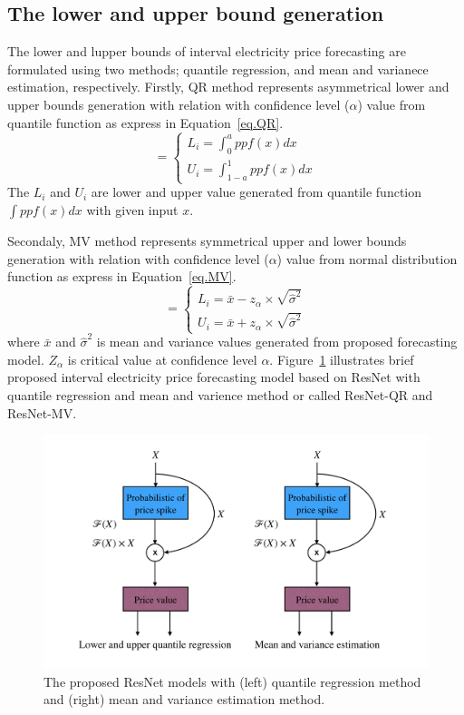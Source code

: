 \documentclass[review]{elsarticle}
\begin{document}
    \subsection{The lower and upper bound generation}
      The lower and lupper bounds of interval electricity price forecasting are formulated using two methods; quantile regression, and mean and varianece estimation, respectively.
      Firstly, QR method represents asymmetrical lower and upper bounds generation with relation with confidence level ($\alpha$) value from quantile function as express in Equation~\ref{eq.QR}.
      \begin{equation}
        [L_{i}, U_{i}]=
        \begin{cases}
        L_{i}=\int_{0}^{a} ppf(x) dx\\
        U_{i}=\int_{1-a}^{1} ppf(x) dx
        \end{cases}
        \label{eq.QR}
      \end{equation}
      The $L_{i}$ and $U_{i}$ are lower and upper value generated from quantile function $\int ppf(x) dx$ with given input $x$.

      Secondaly, MV method represents symmetrical upper and lower bounds generation with relation with confidence level ($\alpha$) value from normal distribution function as express in Equation~\ref{eq.MV}.
      \begin{equation}
        [L_{i}, U_{i}]=
        \begin{cases}
          L_{i}=\bar{x} - z_{\alpha} \times \sqrt{\hat{\sigma}^2}\\
          U_{i}=\bar{x} + z_{\alpha} \times \sqrt{\hat{\sigma}^2}
        \end{cases}
        \label{eq.MV}
      \end{equation}
      where $\bar{x}$ and $\hat{\sigma}^2$ is mean and variance values generated from proposed forecasting model. $Z_{\alpha}$ is critical value at confidence level $\alpha$.
      Figure~\ref{Fig:UB_LB_MV_PDRNN} illustrates brief proposed interval electricity price forecasting model based on ResNet with quantile regression and mean and varience method or called ResNet-QR and ResNet-MV.
      \begin{figure}[H]
        \includegraphics[width=12cm]{UB_LB_MV_PDRNN}
        \caption{The proposed ResNet models with (left) quantile regression method and (right) mean and variance estimation method.}
        \label{Fig:UB_LB_MV_PDRNN}
        \centering
      \end{figure}
\end{document}
